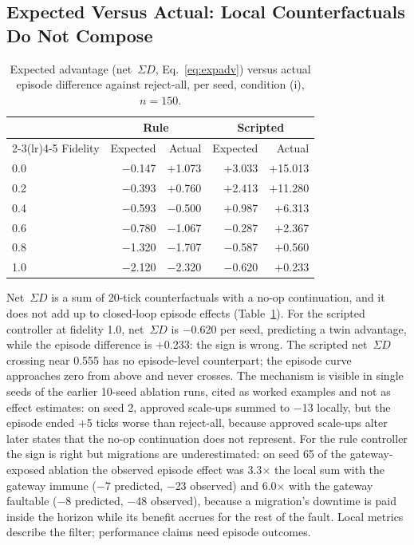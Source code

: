 \documentclass[conference]{IEEEtran}
\newcommand{\netSD}{net~$\Sigma D$}
\newcommand{\NetSD}{Net~$\Sigma D$}
\begin{document}
\subsection{Expected Versus Actual: Local Counterfactuals Do Not Compose}
\begin{table}[t]
\centering
\caption{Expected advantage (\netSD{}, Eq.~\eqref{eq:expadv}) versus actual episode difference against reject-all, per seed, condition (i), $n=150$.}
\label{tab:expected}
\footnotesize
\setlength{\tabcolsep}{4pt}
\begin{tabular}{@{}lrrrr@{}}
\toprule
& \multicolumn{2}{c}{Rule} & \multicolumn{2}{c}{Scripted} \\
\cmidrule(lr){2-3}\cmidrule(lr){4-5}
Fidelity & Expected & Actual & Expected & Actual \\
\midrule
0.0 & \ensuremath{-}0.147 & \ensuremath{+}1.073 & \ensuremath{+}3.033 & \ensuremath{+}15.013 \\
0.2 & \ensuremath{-}0.393 & \ensuremath{+}0.760 & \ensuremath{+}2.413 & \ensuremath{+}11.280 \\
0.4 & \ensuremath{-}0.593 & \ensuremath{-}0.500 & \ensuremath{+}0.987 & \ensuremath{+}6.313 \\
0.6 & \ensuremath{-}0.780 & \ensuremath{-}1.067 & \ensuremath{-}0.287 & \ensuremath{+}2.367 \\
0.8 & \ensuremath{-}1.320 & \ensuremath{-}1.707 & \ensuremath{-}0.587 & \ensuremath{+}0.560 \\
1.0 & \ensuremath{-}2.120 & \ensuremath{-}2.320 & \ensuremath{-}0.620 & \ensuremath{+}0.233 \\
\bottomrule
\end{tabular}
\end{table}
\NetSD{} is a sum of 20-tick counterfactuals with a no-op continuation, and it does not add up to closed-loop episode effects (Table~\ref{tab:expected}). For the scripted controller at fidelity 1.0, \netSD{} is \ensuremath{-}0.620 per seed, predicting a twin advantage, while the episode difference is \ensuremath{+}0.233: the sign is wrong. The scripted \netSD{} crossing near 0.555 has no episode-level counterpart; the episode curve approaches zero from above and never crosses. The mechanism is visible in single seeds of the earlier 10-seed ablation runs, cited as worked examples and not as effect estimates: on seed 2, approved scale-ups summed to \ensuremath{-}13 locally, but the episode ended \ensuremath{+}5 ticks worse than reject-all, because approved scale-ups alter later states that the no-op continuation does not represent. For the rule controller the sign is right but migrations are underestimated: on seed 65 of the gateway-exposed ablation the observed episode effect was 3.3$\times$ the local sum with the gateway immune (\ensuremath{-}7 predicted, \ensuremath{-}23 observed) and 6.0$\times$ with the gateway faultable (\ensuremath{-}8 predicted, \ensuremath{-}48 observed), because a migration's downtime is paid inside the horizon while its benefit accrues for the rest of the fault. Local metrics describe the filter; performance claims need episode outcomes.
\end{document}
